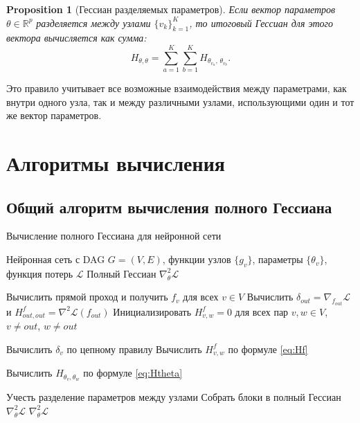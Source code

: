 \documentclass[11pt]{article}
\newtheorem{proposition}{Proposition}
\newcommand{\Ch}{\mathrm{Ch}} %
\begin{document}
\begin{proposition}[Гессиан разделяемых параметров]
  Если вектор параметров $\theta\in\mathbb{R}^p$ разделяется между узлами $\{v_k\}_{k=1}^K$, то итоговый
  Гессиан для этого вектора вычисляется как сумма:
  \[
    H_{\theta,\theta}
    = \sum_{a=1}^K\sum_{b=1}^K
    H_{\theta_{v_a},\,\theta_{v_b}}.
  \]
\end{proposition}

Это правило учитывает все возможные взаимодействия между параметрами, как внутри одного узла, так и между
различными узлами, использующими один и тот же вектор параметров.

\section{Алгоритмы вычисления}

\subsection{Общий алгоритм вычисления полного Гессиана}

\begin{algorithm}
  \caption{Вычисление полного Гессиана для нейронной сети}
  \begin{algorithmic}[1]

    \Require Нейронная сеть с DAG $G=(V,E)$, функции узлов $\{g_v\}$, параметры $\{\theta_v\}$, функция
    потерь $\mathcal{L}$
    \Ensure Полный Гессиан $\nabla^2_\theta \mathcal{L}$

    \State Вычислить прямой проход и получить $f_v$ для всех $v \in V$
    \State Вычислить $\delta_{out} = \nabla_{f_{out}} \mathcal{L}$ и $H^f_{out,out} = \nabla^2 \mathcal{L}(f_{out})$
    \State Инициализировать $H^f_{v,w} = 0$ для всех пар $v,w \in V$, $v \neq out$, $w \neq out$

    \State Вычислить $\delta_v$ по цепному правилу
    \For{$w \in V$ такие, что $\Ch(v) \cap \Ch(w) \neq \emptyset$}
    \State Вычислить $H^f_{v,w}$ по формуле \eqref{eq:Hf}
    \EndFor
    \EndFor

    \State Вычислить $H_{\theta_v, \theta_w}$ по формуле \eqref{eq:Htheta}
    \EndFor
    \EndFor

    \State Учесть разделение параметров между узлами
    \State Собрать блоки в полный Гессиан $\nabla^2_\theta \mathcal{L}$
    \State \Return $\nabla^2_\theta \mathcal{L}$
  \end{algorithmic}
\end{algorithm}
\end{document}
